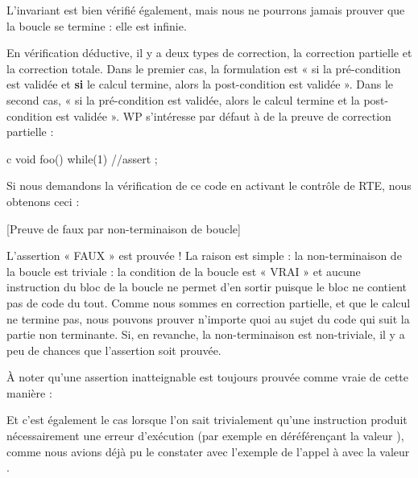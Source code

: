 L'invariant est bien vérifié également, mais nous ne pourrons jamais prouver
que la boucle se termine : elle est infinie.





En vérification déductive, il y a deux types de correction, la correction 
partielle et la correction totale. Dans le premier cas, la formulation est 
« si la pré-condition est validée et \textbf{si} le calcul termine, alors la 
post-condition est validée ». Dans le second cas, « si la pré-condition est 
validée, alors le calcul termine et la post-condition est validée ». WP 
s'intéresse par défaut à de la preuve de correction partielle :



\begin{CodeBlock}{c}
void foo(){
  while(1){}
  //assert \false;
}
\end{CodeBlock}



Si nous demandons la vérification de ce code en activant le contrôle de RTE,
nous obtenons ceci :



[Preuve de faux par non-terminaison de boucle]


L'assertion « FAUX » est prouvée ! La raison est simple : la non-terminaison de
la boucle est triviale : la condition de la boucle est « VRAI » et aucune instruction
du bloc de la boucle ne permet d'en sortir puisque le bloc ne contient pas de code du
tout. Comme nous sommes en correction partielle, et que le calcul ne termine pas, nous
pouvons prouver n'importe quoi au sujet du code qui suit la partie non terminante. Si,
en revanche, la non-terminaison est non-triviale, il y a peu de chances que l'assertion
soit prouvée.



\begin{Information}
À noter qu'une assertion inatteignable est toujours prouvée comme vraie de cette 
manière :

Et c'est également le cas lorsque l'on sait trivialement qu'une instruction
produit nécessairement une erreur d'exécution (par exemple en déréférençant 
la valeur ), comme nous avions déjà pu le constater avec l'exemple
de l'appel à  avec la valeur .
\end{Information}


